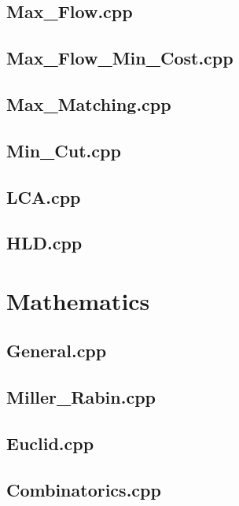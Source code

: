 \subsection{Max\_Flow.cpp}

\subsection{Max\_Flow\_Min\_Cost.cpp}

\subsection{Max\_Matching.cpp}

\subsection{Min\_Cut.cpp}

\subsection{LCA.cpp}

\subsection{HLD.cpp}

\section{Mathematics}
\subsection{General.cpp}

\subsection{Miller\_Rabin.cpp}

\subsection{Euclid.cpp}

\subsection{Combinatorics.cpp}

